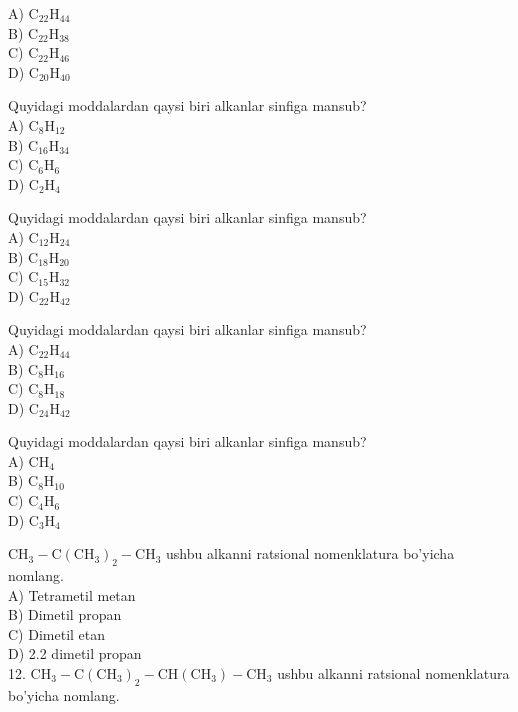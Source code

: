 A) $\mathrm{C}_{22} \mathrm{H}_{44}$\\
B) $\mathrm{C}_{22} \mathrm{H}_{38}$\\
C) $\mathrm{C}_{22} \mathrm{H}_{46}$\\
D) $\mathrm{C}_{20} \mathrm{H}_{40}$
  \item Quyidagi moddalardan qaysi biri alkanlar sinfiga mansub?\\
A) $\mathrm{C}_{8} \mathrm{H}_{12}$\\
B) $\mathrm{C}_{16} \mathrm{H}_{34}$\\
C) $\mathrm{C}_{6} \mathrm{H}_{6}$\\
D) $\mathrm{C}_{2} \mathrm{H}_{4}$
  \item Quyidagi moddalardan qaysi biri alkanlar sinfiga mansub?\\
A) $\mathrm{C}_{12} \mathrm{H}_{24}$\\
B) $\mathrm{C}_{18} \mathrm{H}_{20}$\\
C) $\mathrm{C}_{15} \mathrm{H}_{32}$\\
D) $\mathrm{C}_{22} \mathrm{H}_{42}$
  \item Quyidagi moddalardan qaysi biri alkanlar sinfiga mansub?\\
A) $\mathrm{C}_{22} \mathrm{H}_{44}$\\
B) $\mathrm{C}_{8} \mathrm{H}_{16}$\\
C) $\mathrm{C}_{8} \mathrm{H}_{18}$\\
D) $\mathrm{C}_{24} \mathrm{H}_{42}$
  \item Quyidagi moddalardan qaysi biri alkanlar sinfiga mansub?\\
A) $\mathrm{CH}_{4}$\\
B) $\mathrm{C}_{8} \mathrm{H}_{10}$\\
C) $\mathrm{C}_{4} \mathrm{H}_{6}$\\
D) $\mathrm{C}_{3} \mathrm{H}_{4}$
  \item $\mathrm{CH}_{3}-\mathrm{C}\left(\mathrm{CH}_{3}\right)_{2}-\mathrm{CH}_{3}$ ushbu alkanni ratsional nomenklatura bo'yicha nomlang.\\
A) Tetrametil metan\\
B) Dimetil propan\\
C) Dimetil etan\\
D) 2.2 dimetil propan\\
12. $\mathrm{CH}_{3}-\mathrm{C}\left(\mathrm{CH}_{3}\right)_{2}-\mathrm{CH}\left(\mathrm{CH}_{3}\right)-\mathrm{CH}_{3}$ ushbu alkanni ratsional nomenklatura bo'yicha nomlang.\\
